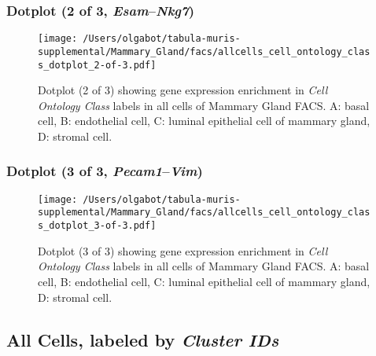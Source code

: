 \clearpage

\subsubsection{Dotplot (2 of 3, \emph{Esam}--\emph{Nkg7})}
\begin{figure}[h]
\centering
\texttt{[image: /Users/olgabot/tabula-muris-supplemental/Mammary\_Gland/facs/allcells\_cell\_ontology\_class\_dotplot\_2-of-3.pdf]}

\caption{ Dotplot (2 of 3)  showing gene expression enrichment in \emph{Cell Ontology Class} labels in all cells of Mammary Gland FACS. A: basal cell, B: endothelial cell, C: luminal epithelial cell of mammary gland, D: stromal cell.}
\end{figure}


\clearpage

\subsubsection{Dotplot (3 of 3, \emph{Pecam1}--\emph{Vim})}
\begin{figure}[h]
\centering
\texttt{[image: /Users/olgabot/tabula-muris-supplemental/Mammary\_Gland/facs/allcells\_cell\_ontology\_class\_dotplot\_3-of-3.pdf]}

\caption{ Dotplot (3 of 3)  showing gene expression enrichment in \emph{Cell Ontology Class} labels in all cells of Mammary Gland FACS. A: basal cell, B: endothelial cell, C: luminal epithelial cell of mammary gland, D: stromal cell.}
\end{figure}


\clearpage

\subsection{All Cells, labeled by \emph{Cluster IDs}}
